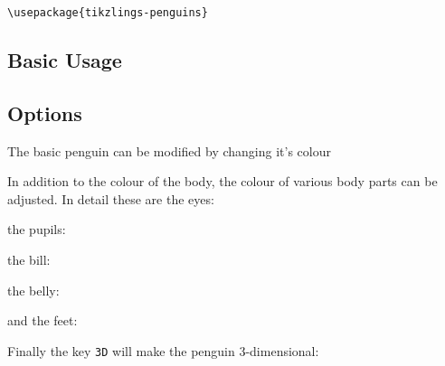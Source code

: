 \documentclass[parskip=half]{scrartcl}
\begin{document}
\begin{tcolorbox}[lower separated=false, lefthand width=.8\linewidth]
\vspace*{0.5cm}
\lstinline|\usepackage{tikzlings-penguins}|
\vspace*{0.5cm}
\end{tcolorbox}

\subsection{Basic Usage}

\begin{tcblisting}{}
\penguin
\end{tcblisting}

\subsection{Options}

The basic penguin can be modified by changing it's colour

\begin{tcblisting}{}
\penguin[body=SteelBlue]
\end{tcblisting}

In addition to the colour of the body, the colour of various body parts can be adjusted. In detail these are the eyes:

\begin{tcblisting}{}
\penguin[eye=red]
\end{tcblisting}

the pupils:

\begin{tcblisting}{}
\penguin[pupil=red]
\end{tcblisting}

the bill:

\begin{tcblisting}{}
\penguin[bill=red]
\end{tcblisting}

the belly:

\begin{tcblisting}{}
\penguin[belly=red]
\end{tcblisting}

and the feet:

\begin{tcblisting}{}
\penguin[feet=red]
\end{tcblisting}

Finally the key \lstinline|3D| will make the penguin 3-dimensional:
\end{document}
